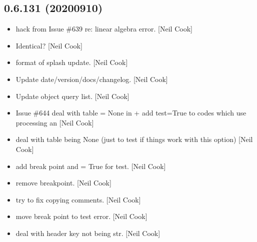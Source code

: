 \documentclass[a4paper,10pt,english]{report}
\begin{document}
\subsection{0.6.131 (2020\sphinxhyphen{}09\sphinxhyphen{}10)}
\label{\detokenize{misc/changelog:id1}}\begin{itemize}
\item {} 
 \sphinxhyphen{} hack from Issue \#639 re: linear
algebra error. {[}Neil Cook{]}

\item {} 
Identical? {[}Neil Cook{]}

\item {} 
 \sphinxhyphen{} format of splash update. {[}Neil Cook{]}

\item {} 
Update date/version/docs/changelog. {[}Neil Cook{]}

\item {} 
Update object query list. {[}Neil Cook{]}

\item {} 
Issue \#644 \sphinxhyphen{} deal with table = None in  + add
\textendash{}test=True to codes which use processing  an
 {[}Neil Cook{]}

\item {} 
 \sphinxhyphen{} deal with table being
None (just to test if things work with this option) {[}Neil Cook{]}

\item {} 
 \sphinxhyphen{} add break point and
 = True for test. {[}Neil Cook{]}

\item {} 
 \sphinxhyphen{} remove breakpoint. {[}Neil Cook{]}

\item {} 
 \sphinxhyphen{} try to fix copying comments. {[}Neil Cook{]}

\item {} 
 \sphinxhyphen{} move break point to
test error. {[}Neil Cook{]}

\item {} 
 \sphinxhyphen{} deal with header key not being str. {[}Neil Cook{]}


\end{itemize}
\end{document}
